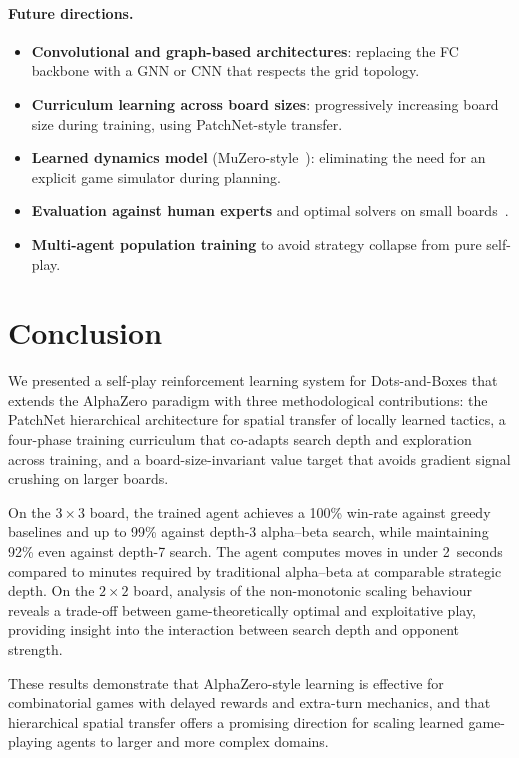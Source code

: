 \documentclass[11pt]{article}
\begin{document}
\paragraph{Future directions.}
\begin{itemize}
  \item \textbf{Convolutional and graph-based architectures}: replacing
    the FC backbone with a GNN or CNN that respects the grid topology.
  \item \textbf{Curriculum learning across board sizes}: progressively
    increasing board size during training, using PatchNet-style transfer.
  \item \textbf{Learned dynamics model} (MuZero-style~\cite{schrittwieser2020mastering}):
    eliminating the need for an explicit game simulator during planning.
  \item \textbf{Evaluation against human experts} and optimal solvers
    on small boards~\cite{barker2012solving}.
  \item \textbf{Multi-agent population training} to avoid strategy
    collapse from pure self-play.
\end{itemize}

\section{Conclusion}
\label{sec:conclusion}

We presented a self-play reinforcement learning system for
Dots-and-Boxes that extends the AlphaZero paradigm with three
methodological contributions: the PatchNet hierarchical architecture for
spatial transfer of locally learned tactics, a four-phase training
curriculum that co-adapts search depth and exploration across training,
and a board-size-invariant value target that avoids gradient signal
crushing on larger boards.

On the $3{\times}3$ board, the trained agent achieves a 100\% win-rate
against greedy baselines and up to 99\% against depth-3 alpha--beta
search, while maintaining 92\% even against depth-7 search. The agent
computes moves in under 2~seconds compared to minutes required by
traditional alpha--beta at comparable strategic depth. On the
$2{\times}2$ board, analysis of the non-monotonic scaling behaviour
reveals a trade-off between game-theoretically optimal and exploitative
play, providing insight into the interaction between search depth and
opponent strength.

These results demonstrate that AlphaZero-style learning is effective for
combinatorial games with delayed rewards and extra-turn mechanics, and
that hierarchical spatial transfer offers a promising direction for
scaling learned game-playing agents to larger and more complex domains.



\end{document}
